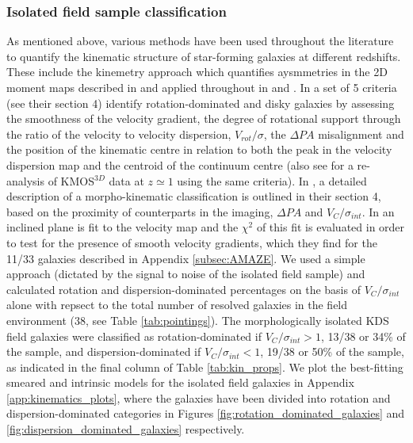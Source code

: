 \documentclass[fleqn,usenatbib]{mnras}
\begin{document}
\subsubsection{Isolated field sample classification}\label{subsubsection:isolated_classification}
As mentioned above, various methods have been used throughout the literature to quantify the kinematic structure of star-forming galaxies at different redshifts. 
These include the kinemetry approach which quantifies aysmmetries in the 2D moment maps described in \cite{Shapiro2008} and applied throughout in \cite{ForsterSchreiber2009} and \cite{Cresci2009}.
In \cite{Wisnioski2015} a set of 5 criteria (see their section 4) identify rotation-dominated and disky galaxies by assessing the smoothness of the velocity gradient, the degree of rotational support through the ratio of the velocity to velocity dispersion, $V_{rot}/\sigma$, the $\Delta PA$ misalignment and the position of the kinematic centre in relation to both the peak in the velocity dispersion map and the centroid of the continuum centre (also see \citealt{Rodrigues2017} for a re-analysis of KMOS$^{3D}$ data at $z\simeq1$ using the same criteria).   
In \cite{Epinat2012}, a detailed description of a morpho-kinematic classification is outlined in their section 4, based on the proximity of counterparts in the imaging, $\Delta PA$ and $V_{C}/\sigma_{int}$.
In \cite{Gnerucci2011} an inclined plane is fit to the velocity map and the $\chi^{2}$ of this fit is evaluated in order to test for the presence of smooth velocity gradients, which they find for the 11/33 galaxies described in Appendix \ref{subsec:AMAZE}.
We used a simple approach (dictated by the signal to noise of the isolated field sample) and calculated rotation and dispersion-dominated percentages on the basis of $V_{C}/\sigma_{int}$ alone with repsect to the total number of resolved galaxies in the field environment (38, see Table \ref{tab:pointings}).
The morphologically isolated KDS field galaxies were classified as rotation-dominated if $V_{C}/\sigma_{int} > 1$, 13/38 or 34\% of the sample, and dispersion-dominated if $V_{C}/\sigma_{int} < 1$, 19/38 or 50\% of the sample, as indicated in the final column of Table \ref{tab:kin_props}.
We plot the best-fitting smeared and intrinsic models for the isolated field galaxies in Appendix \ref{app:kinematics_plots}, where the galaxies have been divided into rotation and dispersion-dominated categories in Figures \ref{fig:rotation_dominated_galaxies} and \ref{fig:dispersion_dominated_galaxies} respectively.
\end{document}
